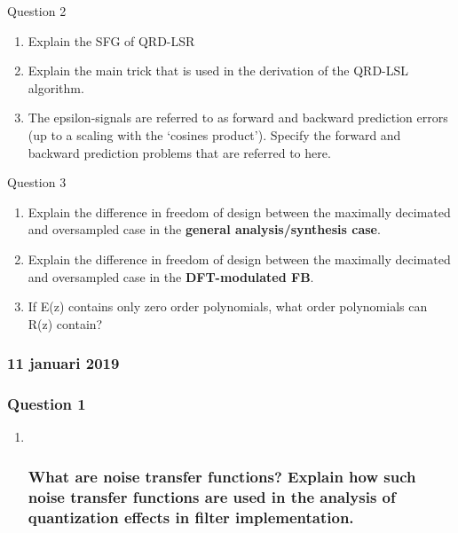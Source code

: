 \documentclass[
  a4paper,
  ,captions=tableheading
]{scrartcl}
\providecommand{\tightlist}{%
  \setlength{\itemsep}{0pt}\setlength{\parskip}{0pt}}
\begin{document}
Question 2

\begin{enumerate}
\def\labelenumi{\arabic{enumi}.}
\tightlist
\item
  Explain the SFG of QRD-LSR\\
\item
  Explain the main trick that is used in the derivation of the QRD-LSL
  algorithm.\\
\item
  The epsilon-signals are referred to as forward and backward prediction
  errors (up to a scaling with the `cosines product'). Specify the
  forward and backward prediction problems that are referred to here.
\end{enumerate}

Question 3

\begin{enumerate}
\def\labelenumi{\arabic{enumi}.}
\tightlist
\item
  Explain the difference in freedom of design between the maximally
  decimated and oversampled case in the \textbf{general
  analysis/synthesis case}.\\
\item
  Explain the difference in freedom of design between the maximally
  decimated and oversampled case in the \textbf{DFT-modulated FB}.\\
\item
  If E(z) contains only zero order polynomials, what order polynomials
  can R(z) contain?
\end{enumerate}

\subsubsection{\texorpdfstring{\textbf{11 januari
2019}}{11 januari 2019}}\label{januari-2019}

\subsubsection{Question 1}\label{question-1-3}

\begin{enumerate}
\def\labelenumi{\arabic{enumi}.}
\item ~
  \subsubsection{What are noise transfer functions? Explain how such
  noise transfer functions are used in the analysis of quantization
  effects in filter
  implementation.}\label{what-are-noise-transfer-functions-explain-how-such-noise-transfer-functions-are-used-in-the-analysis-of-quantization-effects-in-filter-implementation.}
\end{enumerate}
\end{document}
